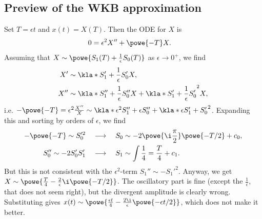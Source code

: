 \documentclass[english, parskip=full]{scrartcl}
\begin{document}
\subsection{Preview of the WKB approximation}
Set $T=\epsilon t$ and $x(t)=X(T)$.
Then the ODE for $X$ is
\begin{align}
0 &= \epsilon^2 X'' + \powe{-T}X.
\end{align}
Assuming that $X\sim \powe{S_1(T) + \frac{1}{\epsilon} S_0(T)}$ as $\epsilon\rightarrow 0^+$, we find
\begin{align}
X' &\sim \kla*{S_1' + \frac{1}{\epsilon} S_0'} X,\\
X'' &\sim \kla*{S_1'' + \frac{1}{\epsilon}S_0''} X + \kla*{S_1' + \frac{1}{\epsilon} S_0'}^2 X,
\end{align}
i.e. $-\powe{-T} = \epsilon^2\frac{X''}{X} \sim \kla*{\epsilon^2 S_1'' + \epsilon S_0''} + \kla*{\epsilon S_1' + S_0'}^2$.
Expanding this and sorting by orders of $\epsilon$, we find
\begin{align}
-\powe{-T} \sim S_0'^2 \quad &\longrightarrow \quad S_0 \sim -2\powe{\i\frac{\pi}{2}}\powe{-T/2} + c_0,\\
S_0'' \sim -2S_0'S_1' \quad &\longrightarrow \quad S_1 \sim \int \frac{1}{4} = \frac{T}{4} + c_1.
\end{align}
But this is not consistent with the $\epsilon^2$-term $S_1'' \sim -S_1'^2$.
Anyway, we get $X\sim \powe{\frac{T}{4} - \frac{2}{\epsilon} \i \powe{-T/2}}$.
The oscillatory part is fine (except the $\frac{1}{\epsilon}$, that does not seem right), but the divergent amplitude is clearly wrong.
Substituting gives $x(t) \sim \powe{\frac{\epsilon t}{4} - \frac{2\i}{\epsilon} \powe{-\epsilon t/2}}$, which does not make it better.
\end{document}
